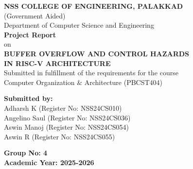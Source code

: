 \begin{center}
{\Large \bfseries NSS COLLEGE OF ENGINEERING, PALAKKAD}\\[0.5cm]
{\large (Government Aided)}\\[0.5cm]
{\large Department of Computer Science and Engineering}\\[2cm]

{\Large \bfseries Project Report}\\[0.5cm]
{\large on}\\[0.5cm]

{\LARGE \bfseries BUFFER OVERFLOW AND CONTROL HAZARDS\\ IN RISC-V ARCHITECTURE}\\[2cm]

{\large Submitted in fulfillment of the requirements for the course\\
Computer Organization \& Architecture (PBCST404)}\\[2cm]

\begin{flushleft}
{\large \bfseries Submitted by:}\\
Adharsh K \hspace{1.2cm} (Register No: NSS24CS010)\\
Angelino Saul \hspace{0.7cm} (Register No: NSS24CS036)\\
Aswin Manoj \hspace{1.0cm} (Register No: NSS24CS054)\\
Aswin R \hspace{1.5cm} (Register No: NSS24CS055)
\end{flushleft}

\vspace{1cm}
{\large \bfseries Group No: 4}\\[2cm]

{\large \bfseries Academic Year: 2025-2026}
\end{center}
\thispagestyle{empty}
\newpage
